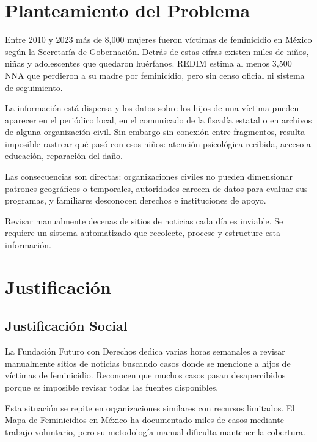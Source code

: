 
\section{Planteamiento del Problema}
\label{sec:planteamiento_problema}

Entre 2010 y 2023 más de 8,000 mujeres fueron víctimas de feminicidio en México según la Secretaría de Gobernación. Detrás de estas cifras existen miles de niños, niñas y adolescentes que quedaron huérfanos. REDIM estima al menos 3,500 NNA que perdieron a su madre por feminicidio, pero sin censo oficial ni sistema de seguimiento.

La información está dispersa y los datos sobre los hijos de una víctima pueden aparecer en el periódico local, en el comunicado de la fiscalía estatal o en archivos de alguna organización civil. Sin embargo sin conexión entre fragmentos, resulta imposible rastrear qué pasó con esos niños: atención psicológica recibida, acceso a educación, reparación del daño.

Las consecuencias son directas: organizaciones civiles no pueden dimensionar patrones geográficos o temporales, autoridades carecen de datos para evaluar sus programas, y familiares desconocen derechos e instituciones de apoyo.

Revisar manualmente decenas de sitios de noticias cada día es inviable. Se requiere un sistema automatizado que recolecte, procese y estructure esta información.

\section{Justificación}
\label{sec:justificacion}

\subsection{Justificación Social}
La Fundación Futuro con Derechos dedica varias horas semanales a revisar manualmente sitios de noticias buscando casos donde se mencione a hijos de víctimas de feminicidio. Reconocen que muchos casos pasan desapercibidos porque es imposible revisar todas las fuentes disponibles.

Esta situación se repite en organizaciones similares con recursos limitados. El Mapa de Feminicidios en México ha documentado miles de casos mediante trabajo voluntario, pero su metodología manual dificulta mantener la cobertura.

